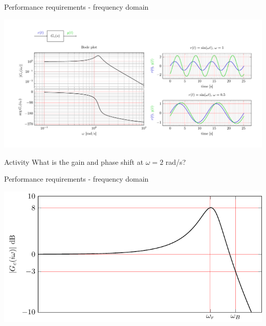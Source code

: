 \documentclass[presentation,aspectratio=169, usenames, dvipsnames]{beamer}
\begin{document}
\begin{frame}[label={sec:orgdebb4b0}]{Performance requirements - frequency domain}
\begin{center}
  \includegraphics[width=1.0\linewidth]{../../figures/bode-closed-loop-example-responses}
\end{center}

\pause

\alert{Activity} What is the gain and phase shift at \(\omega = 2\) rad/s?
\end{frame}

\begin{frame}[label={sec:orgfefd3ae}]{Performance requirements - frequency domain}
\begin{center}
  \includegraphics[width=.8\linewidth]{../../figures/spec-bode-closed-loop-new}
\end{center}
\end{frame}
\end{document}
